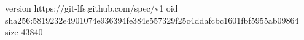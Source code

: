 version https://git-lfs.github.com/spec/v1
oid sha256:5819232e4901074e936394fe384e557329f25c4ddafcbc1601fbf5955ab09864
size 43840
